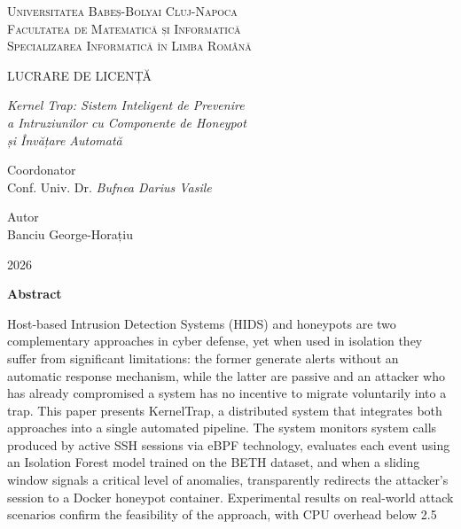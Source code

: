\documentclass[12pt, a4paper]{report}
\begin{document}
\onehalfspacing

\begin{titlepage}
  \centering

  \textsc{Universitatea Babeș-Bolyai Cluj-Napoca}\\
  \textsc{Facultatea de Matematică și Informatică}\\
  \textsc{Specializarea Informatică în Limba Română}

  \vspace{5cm}

  {\Large LUCRARE DE LICENȚĂ}

  \vspace{1.5cm}

  {\large\itshape Kernel Trap: Sistem Inteligent de Prevenire\\
  a Intruziunilor cu Componente de Honeypot\\
  și Învățare Automată}

  \vfill

  \begin{minipage}{0.45\textwidth}
    \flushleft
    Coordonator\\
    Conf. Univ. Dr. \textit{Bufnea Darius Vasile}
  \end{minipage}
  \hfill
  \begin{minipage}{0.45\textwidth}
    \flushright
    Autor\\
    Banciu George-Horațiu
  \end{minipage}

  \vspace{2cm}
  2026

\end{titlepage}

\newpage
\begin{center}
  {\large\bfseries Abstract}
\end{center}
\vspace{0.5cm}

Host-based Intrusion Detection Systems (HIDS) and honeypots are two complementary
approaches in cyber defense, yet when used in isolation they suffer from significant limitations:
the former generate alerts without an automatic response mechanism, while the 
latter are passive and an attacker who has already compromised a system has no incentive
to migrate voluntarily into a trap. This paper presents KernelTrap, a distributed system that
integrates both approaches into a single automated pipeline. 
The system monitors system calls produced by active SSH sessions via eBPF technology, 
evaluates each event using an Isolation Forest model trained on the BETH dataset, and when a sliding 
window signals a critical level of anomalies, transparently redirects the attacker's session to a Docker honeypot 
container. Experimental results on real-world attack scenarios confirm the feasibility of the approach,
with CPU overhead below 2.5%
\newpage
\tableofcontents
\newpage
\end{document}
